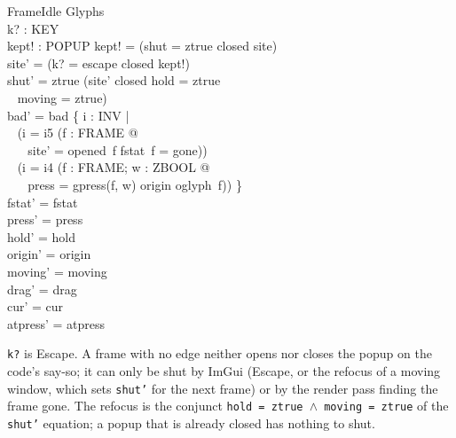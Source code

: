 \documentclass[a4paper,10pt,fleqn]{article}
\begin{document}
\begin{schema}{FrameIdle}
  \Delta Glyphs \\
  k? : KEY \\
  kept! : POPUP
\where
  kept! = (\IF shut = ztrue \THEN closed \ELSE site) \\
  site' = (\IF k? = escape \THEN closed \ELSE kept!) \\
  shut' = ztrue \iff (site' \neq closed \land hold = ztrue \\
  \quad~ \land moving = ztrue) \\
  bad' = bad \cup \{ i : INV | \\
  \quad~ (i = i5 \land (\exists f : FRAME @ \\
  \quad~ \quad~ site' = opened~f \land fstat~f = gone)) \\
  \quad~ \lor (i = i4 \land (\exists f : FRAME; w : ZBOOL @ \\
  \quad~ \quad~ press = gpress(f, w) \land origin \neq oglyph~f)) \} \\
  fstat' = fstat \\
  press' = press \\
  hold' = hold \\
  origin' = origin \\
  moving' = moving \\
  drag' = drag \\
  cur' = cur \\
  atpress' = atpress
\end{schema}

\texttt{k?} is Escape.  A frame with no edge neither opens nor closes the popup
on the code's say-so; it can only be shut by ImGui (Escape, or the refocus of a
moving window, which sets \texttt{shut'} for the next frame) or by the render
pass finding the frame gone.  The refocus is the conjunct
\texttt{hold~=~ztrue~$\land$~moving~=~ztrue} of the \texttt{shut'} equation; a
popup that is already closed has nothing to shut.
\end{document}
